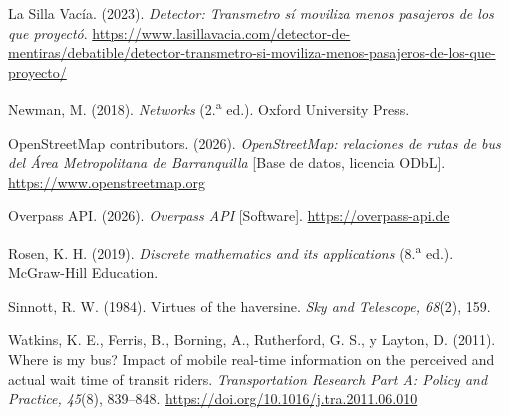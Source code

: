 \documentclass[12pt,letterpaper]{article}
\begin{document}
\begin{list}{}{\setlength{\leftmargin}{1.27cm}\setlength{\itemindent}{-1.27cm}\setlength{\itemsep}{4pt}}
\item La Silla Vacía. (2023). \textit{Detector: Transmetro sí moviliza menos pasajeros de los que proyectó}. \url{https://www.lasillavacia.com/detector-de-mentiras/debatible/detector-transmetro-si-moviliza-menos-pasajeros-de-los-que-proyecto/}
\item Newman, M. (2018). \textit{Networks} (2.\textsuperscript{a} ed.). Oxford University Press.
\item OpenStreetMap contributors. (2026). \textit{OpenStreetMap: relaciones de rutas de bus del Área Metropolitana de Barranquilla} [Base de datos, licencia ODbL]. \url{https://www.openstreetmap.org}
\item Overpass API. (2026). \textit{Overpass API} [Software]. \url{https://overpass-api.de}
\item Rosen, K. H. (2019). \textit{Discrete mathematics and its applications} (8.\textsuperscript{a} ed.). McGraw-Hill Education.
\item Sinnott, R. W. (1984). Virtues of the haversine. \textit{Sky and Telescope, 68}(2), 159.
\item Watkins, K. E., Ferris, B., Borning, A., Rutherford, G. S., y Layton, D. (2011). Where is my bus? Impact of mobile real-time information on the perceived and actual wait time of transit riders. \textit{Transportation Research Part A: Policy and Practice, 45}(8), 839--848. \url{https://doi.org/10.1016/j.tra.2011.06.010}
\end{list}
\end{document}
